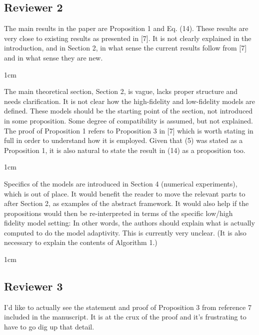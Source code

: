 \documentclass[12pt, letterpaper]{article}
\newcommand{\answer}[1]{\begin{adjustwidth}{1cm}{}{\color{blue}#1}\end{adjustwidth}}
\newcommand{\notdone}{{\color{red}{Changes not yet made.}}}
\begin{document}

\subsection*{Reviewer 2}

The main results in the paper are Proposition 1 and Eq. (14). These results are very close to existing results as presented in [7]. It is not clearly explained in the introduction, and in Section 2, in what sense the current results follow from [7] and in what sense they are new. 

\answer{}
\notdone

The main theoretical section, Section 2, is vague, lacks proper structure and needs clarification. It is not clear how the high-fidelity and low-fidelity models are defined. These models should be the starting point of the section, not introduced in some proposition. Some degree of compatibility is assumed, but not explained. The proof of Proposition 1 refers to Proposition 3 in [7] which is worth stating in full in order to understand how it is employed. Given that (5) was stated as a Proposition 1, it is also natural to state the result in (14) as a proposition too. 

\answer{}
\notdone

Specifics of the models are introduced in Section 4 (numerical experiments), which is out of place. It would benefit the reader to move the relevant parts to after Section 2, as examples of the abstract framework. It would also help if the propositions would then be re-interpreted in terms of the specific low/high fidelity model setting: In other words, the authors should explain what is actually computed to do the model adaptivity. This is currently very unclear. (It is also necessary to explain the contents of Algorithm 1.)

\answer{}
\notdone


\subsection*{Reviewer 3}

I'd like to actually see the statement and proof of Proposition 3 from reference 7 included in
the manuscript. It is at the crux of the proof and it's frustrating to have to go dig up that
detail.
\end{document}
